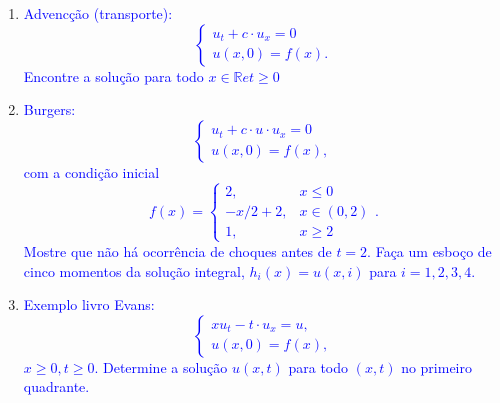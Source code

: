 \documentclass[a4paper,12pt]{article}
\newcommand{\R}{\mathbb{R}}
\theoremstyle{exer}
\theoremstyle{definition}
\newcommand{\enu}[1]{\textcolor{blue}{#1}}
\begin{document}
\begin{enumerate}
    \item \enu{Advencção (transporte): 
    $$
    \begin{cases}
        u_t + c\cdot u_x = 0 \\
        u(x,0) = f(x).
    \end{cases}
    $$
    Encontre a solução para todo $x \in \R e t \ge 0$
    }

    \item \enu{
        Burgers:
        $$
        \begin{cases}
            u_t + c\cdot u\cdot u_x = 0 \\
            u(x,0) = f(x),
        \end{cases}
        $$
        com a condição inicial $$f(x) = \begin{cases}
            2, &x \le 0 \\
            -x/2 + 2, &x \in (0,2) \\
            1, &x \ge 2
        \end{cases}.
        $$
        Mostre que não há ocorrência de choques antes de $t = 2$. Faça um esboço de cinco momentos da solução integral,
        $h_i(x) = u(x, i)$ para $i=1,2,3,4$.}

        \item \enu{
            Exemplo livro Evans:
            $$
            \begin{cases}
                xu_t - t\cdot u_x = u, \\
                u(x,0) = f(x),
            \end{cases}
            $$
            $x \ge 0, t \ge 0$. Determine a solução $u(x, t)$ para todo $(x, t)$ no primeiro quadrante.   
        }
\end{enumerate}
\end{document}
